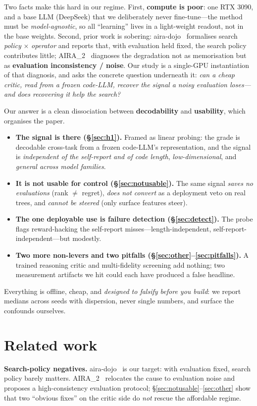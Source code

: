\documentclass[10pt]{article}
\begin{document}
Two facts make this hard in our regime. First, \textbf{compute is poor}: one RTX 3090, and a base LLM (DeepSeek) that we deliberately never fine-tune---the method must be \emph{model-agnostic}, so all ``learning'' lives in a light-weight readout, not in the base weights. Second, prior work is sobering: aira-dojo~\cite{airadojo} formalises search \emph{policy} $\times$ \emph{operator} and reports that, with evaluation held fixed, the search policy contributes little; AIRA\_2~\cite{aira2} diagnoses the degradation not as memorisation but as \textbf{evaluation inconsistency / noise}. Our study is a single-GPU instantiation of that diagnosis, and asks the concrete question underneath it: \emph{can a cheap critic, read from a frozen code-LLM, recover the signal a noisy evaluation loses---and does recovering it help the search?}

Our answer is a clean dissociation between \textbf{decodability} and \textbf{usability}, which organises the paper.
\begin{itemize}\itemsep2pt
  \item \textbf{The signal is there (\S\ref{sec:h1}).} Framed as linear probing: the grade is decodable cross-task from a frozen code-LLM's representation, and the signal is \emph{independent of the self-report and of code length}, \emph{low-dimensional}, and \emph{general across model families}.
  \item \textbf{It is not usable for control (\S\ref{sec:notusable}).} The same signal \emph{saves no evaluations} (rank $\neq$ regret), \emph{does not convert} as a deployment veto on real trees, and \emph{cannot be steered} (only surface features steer).
  \item \textbf{The one deployable use is failure detection (\S\ref{sec:detect}).} The probe flags reward-hacking the self-report misses---length-independent, self-report-independent---but modestly.
  \item \textbf{Two more non-levers and two pitfalls (\S\ref{sec:other}--\ref{sec:pitfalls}).} A trained reasoning critic and multi-fidelity screening add nothing; two measurement artifacts we hit could each have produced a false headline.
\end{itemize}
Everything is offline, cheap, and \emph{designed to falsify before you build}: we report medians across seeds with dispersion, never single numbers, and surface the confounds ourselves.

\section{Related work}
\textbf{Search-policy negatives.} aira-dojo~\cite{airadojo} is our target: with evaluation fixed, search policy barely matters. AIRA\_2~\cite{aira2} relocates the cause to evaluation noise and proposes a high-consistency evaluation protocol; \S\ref{sec:notusable}--\ref{sec:other} show that two ``obvious fixes'' on the critic side do \emph{not} rescue the affordable regime.
\end{document}
